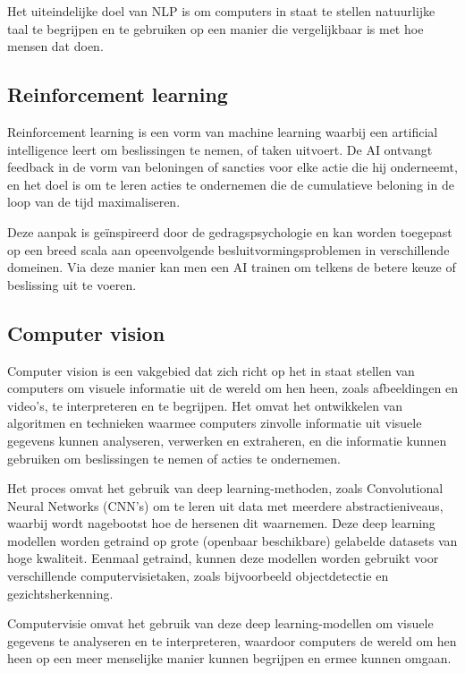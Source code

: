 Het uiteindelijke doel van NLP is om computers in staat te stellen natuurlijke taal te begrijpen en te gebruiken op een manier die vergelijkbaar is met hoe mensen dat doen.

\cite{chowdhary2020natural}

\subsection{Reinforcement learning}

Reinforcement learning is een vorm van machine learning waarbij een artificial intelligence leert om beslissingen te nemen, of taken uitvoert. De AI ontvangt feedback in de vorm van beloningen of sancties voor elke actie die hij onderneemt, en het doel is om te leren acties te ondernemen die de cumulatieve beloning in de loop van de tijd maximaliseren. 

Deze aanpak is geïnspireerd door de gedragspsychologie en kan worden toegepast op een breed scala aan opeenvolgende besluitvormingsproblemen in verschillende domeinen. Via deze manier kan men een AI trainen om telkens de betere keuze of beslissing uit te voeren.

\cite{franccois2018introduction}

\subsection{Computer vision}

Computer vision is een vakgebied dat zich richt op het in staat stellen van computers om visuele informatie uit de wereld om hen heen, zoals afbeeldingen en video's, te interpreteren en te begrijpen. Het omvat het ontwikkelen van algoritmen en technieken waarmee computers zinvolle informatie uit visuele gegevens kunnen analyseren, verwerken en extraheren, en die informatie kunnen gebruiken om beslissingen te nemen of acties te ondernemen.

Het proces omvat het gebruik van deep learning-methoden, zoals Convolutional Neural Networks (CNN's) om te leren uit data met meerdere abstractieniveaus, waarbij wordt nagebootst hoe de hersenen dit waarnemen. Deze deep learning modellen worden getraind op grote (openbaar beschikbare) gelabelde datasets van hoge kwaliteit. Eenmaal getraind, kunnen deze modellen worden gebruikt voor verschillende computervisietaken, zoals bijvoorbeeld objectdetectie en gezichtsherkenning.

Computervisie omvat het gebruik van deze deep learning-modellen om visuele gegevens te analyseren en te interpreteren, waardoor computers de wereld om hen heen op een meer menselijke manier kunnen begrijpen en ermee kunnen omgaan.

